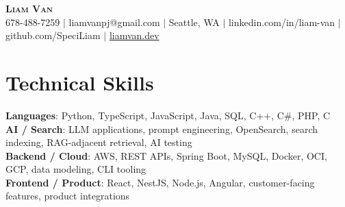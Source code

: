 \documentclass[letterpaper,11pt]{article}
\begin{document}

%
\begin{center}
    \textbf{\Huge \scshape Liam Van} \\ \vspace{1pt}
    \small 678-488-7259 $|$ \small {liamvanpj@gmail.com} $|$ Seattle, WA
 {{$|$ linkedin.com/in/liam-van} {$|$ github.com/SpeciLiam} {$|$ \href{https://liamvan.dev}{liamvan.dev}}}

\end{center}

\section{Technical Skills}
 \begin{itemize}[leftmargin=0.15in, label={}]
    \small{\item{
     \textbf{Languages}{: Python, TypeScript, JavaScript, Java, SQL, C++, C\#, PHP, C} \\
     \textbf{AI / Search}{: LLM applications, prompt engineering, OpenSearch, search indexing, RAG-adjacent retrieval, AI testing} \\
     \textbf{Backend / Cloud}{: AWS, REST APIs, Spring Boot, MySQL, Docker, OCI, GCP, data modeling, CLI tooling} \\
     \textbf{Frontend / Product}{: React, NestJS, Node.js, Angular, customer-facing features, product integrations} \\
    }}
 \end{itemize}
%

\end{document}
